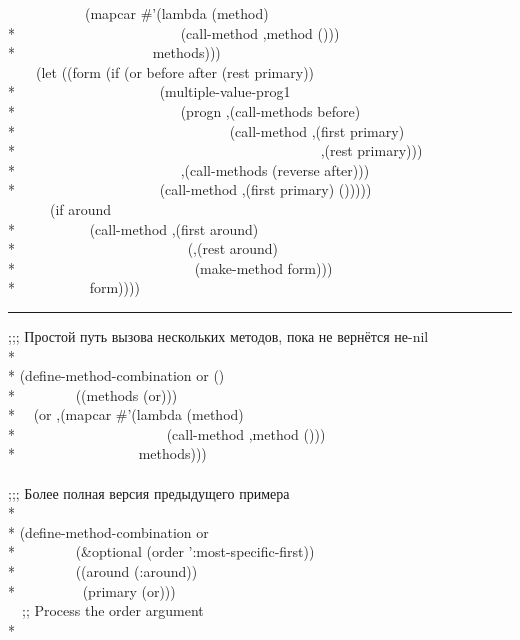 \begin{defmac}
\begin{lisp}
~~~~~~~~~~~(mapcar \#'(lambda (method) \\*
~~~~~~~~~~~~~~~~~~~~~~~{\Xbq}(call-method ,method ())) \\*
~~~~~~~~~~~~~~~~~~~methods))) \\
~~~~(let ((form (if (or before after (rest primary)) \\*
~~~~~~~~~~~~~~~~~~~~{\Xbq}(multiple-value-prog1 \\*
~~~~~~~~~~~~~~~~~~~~~~~(progn ,{\Xatsign}(call-methods before) \\*
~~~~~~~~~~~~~~~~~~~~~~~~~~~~~~(call-method ,(first primary) \\*
~~~~~~~~~~~~~~~~~~~~~~~~~~~~~~~~~~~~~~~~~~~,(rest primary))) \\*
~~~~~~~~~~~~~~~~~~~~~~~,{\Xatsign}(call-methods (reverse after))) \\*
~~~~~~~~~~~~~~~~~~~~{\Xbq}(call-method ,(first primary) ())))) \\
~~~~~~(if around \\*
~~~~~~~~~~{\Xbq}(call-method ,(first around) \\*
~~~~~~~~~~~~~~~~~~~~~~~~(,{\Xatsign}(rest around) \\*
~~~~~~~~~~~~~~~~~~~~~~~~~(make-method form))) \\*
~~~~~~~~~~form))))
\end{lisp}
\hrule width 0pt\relax
\begin{lisp}
;;; Простой путь вызова нескольких методов, пока не вернётся не-nil \\*
\\*
(define-method-combination or () \\*
~~~~~~~~((methods (or))) \\*
~~{\Xbq}(or ,{\Xatsign}(mapcar \#'(lambda (method) \\*
~~~~~~~~~~~~~~~~~~~~~{\Xbq}(call-method ,method ())) \\*
~~~~~~~~~~~~~~~~~methods))) \\
\\
;;; Более полная версия предыдущего примера \\*
\\*
(define-method-combination or  \\*
~~~~~~~~(\&optional (order ':most-specific-first)) \\*
~~~~~~~~((around (:around)) \\*
~~~~~~~~~(primary (or))) \\
~~;; Process the order argument \\*

\end{lisp}
\end{defmac}
